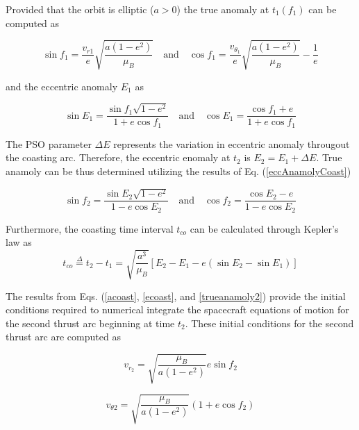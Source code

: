 \noindent Provided that the orbit is elliptic ($a > 0$) the true anomaly at $t_1(f_1)$ can be computed as

\begin{equation}
\sin f_1 = \dfrac{v_{r1}}{e}\sqrt{\dfrac{a(1-e^2)}{\mu_B}} \quad \text{and} \quad \cos{f_1} = \dfrac{v_{\theta_1}}{e}\sqrt{\dfrac{a(1-e^2)}{\mu_B}}-\dfrac{1}{e}
\label{trueAnamolyCoast}
\end{equation} \newline

\noindent and the eccentric anomaly $E_1$ as 

\begin{equation}
\sin{E_1} = \dfrac{\sin{f_1}\sqrt{1-e^2}}{1+e\cos{f_1}} \quad \text{and} \quad 
\cos{E_1} = \dfrac{\cos{f_1}+e}{1+e\cos{f_1}}
\label{eccAnamolyCoast}
\end{equation}

\noindent The PSO parameter $\Delta E$ represents the variation in eccentric anomaly througout the coasting arc. Therefore, the eccentric enomaly at $t_2$ is $E_2 = E_1 + \Delta E$. True anamoly can be
thus determined utilizing the results of Eq. (\ref{eccAnamolyCoast})

\begin{equation}
\sin{f_2} = \dfrac{\sin{E_2}\sqrt{1-e^2}}{1-e\cos{E_2}} \quad \text{and} \quad
\cos{f_2} = \dfrac{\cos{E_2}-e}{1-e\cos{E_2}}
\label{trueanamoly2}
\end{equation}

\noindent Furthermore, the coasting time interval $t_{co}$ can be calculated through Kepler's law as
\begin{equation}
t_{co} \overset{\Delta}{=} t_2 - t_1 = \sqrt{\dfrac{a^3}{\mu_B}}[E_2-E_1-e(\sin{E_2}-\sin{E_1})]
\end{equation}

\noindent The results from Eqs. (\ref{acoast}, \ref{ecoast}, and \ref{trueanamoly2}) provide the initial conditions required to numerical integrate 
the spacecraft equations of motion for the second thrust arc beginning at time $t_2$. These initial conditions for the second thrust arc are computed as

\begin{equation}
v_{r_2} = \sqrt{\dfrac{\mu_B}{a(1-e^2)}}e\sin{f_2}
\label{vr2}
\end{equation}

\begin{equation}
    v_{\theta2} = \sqrt{\dfrac{\mu_B}{a(1-e^2)}}(1+e\cos{f_2})
    \label{vtheta2}
\end{equation}

